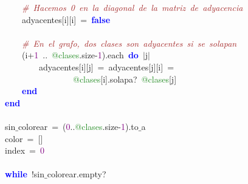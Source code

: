 \mbox{}\ \ \ \ \ \ \ \ \ \ \ \ \textit{\textcolor{Brown}{\#\ Hacemos\ 0\ en\ la\ diagonal\ de\ la\ matriz\ de\ adyacencia}} \\
\mbox{}\ \ \ \ \ \ \ \ \ \ \ \ adyacentes\textcolor{BrickRed}{[}i\textcolor{BrickRed}{][}i\textcolor{BrickRed}{]}\ \textcolor{BrickRed}{=}\ \textbf{\textcolor{Blue}{false}} \\
\mbox{} \\
\mbox{}\ \ \ \ \ \ \ \ \ \ \ \ \textit{\textcolor{Brown}{\#\ En\ el\ grafo,\ dos\ clases\ son\ adyacentes\ si\ se\ solapan}} \\
\mbox{}\ \ \ \ \ \ \ \ \ \ \ \ \textcolor{BrickRed}{(}i\textcolor{BrickRed}{+}\textcolor{Purple}{1}\ \textcolor{BrickRed}{..}\ \textcolor{ForestGreen}{@clases}\textcolor{BrickRed}{.}size\textcolor{BrickRed}{-}\textcolor{Purple}{1}\textcolor{BrickRed}{).}each\ \textbf{\textcolor{Blue}{do}}\ \textcolor{BrickRed}{$|$}j\textcolor{BrickRed}{$|$} \\
\mbox{}\ \ \ \ \ \ \ \ \ \ \ \ \ \ \ \ adyacentes\textcolor{BrickRed}{[}i\textcolor{BrickRed}{][}j\textcolor{BrickRed}{]}\ \textcolor{BrickRed}{=}\ adyacentes\textcolor{BrickRed}{[}j\textcolor{BrickRed}{][}i\textcolor{BrickRed}{]}\ \textcolor{BrickRed}{=}\  \\
\mbox{}\ \ \ \ \ \ \ \ \ \ \ \ \ \ \ \ \ \ \ \ \ \ \ \ \textcolor{ForestGreen}{@clases}\textcolor{BrickRed}{[}i\textcolor{BrickRed}{].}solapa?\ \textcolor{ForestGreen}{@clases}\textcolor{BrickRed}{[}j\textcolor{BrickRed}{]} \\
\mbox{}\ \ \ \ \ \ \ \ \ \ \ \ \textbf{\textcolor{Blue}{end}} \\
\mbox{}\ \ \ \ \ \ \ \ \textbf{\textcolor{Blue}{end}} \\
\mbox{}\ \ \ \ \ \ \ \  \\
\mbox{}\ \ \ \ \ \ \ \ sin$\_$colorear\ \textcolor{BrickRed}{=}\ \textcolor{BrickRed}{(}\textcolor{Purple}{0}\textcolor{BrickRed}{..}\textcolor{ForestGreen}{@clases}\textcolor{BrickRed}{.}size\textcolor{BrickRed}{-}\textcolor{Purple}{1}\textcolor{BrickRed}{).}to$\_$a \\
\mbox{}\ \ \ \ \ \ \ \ color\ \textcolor{BrickRed}{=}\ \textcolor{BrickRed}{[]} \\
\mbox{}\ \ \ \ \ \ \ \ index\ \textcolor{BrickRed}{=}\ \textcolor{Purple}{0} \\
\mbox{}\ \ \ \ \ \ \ \  \\
\mbox{}\ \ \ \ \ \ \ \ \textbf{\textcolor{Blue}{while}}\ \textcolor{BrickRed}{!}sin$\_$colorear\textcolor{BrickRed}{.}empty? \\
